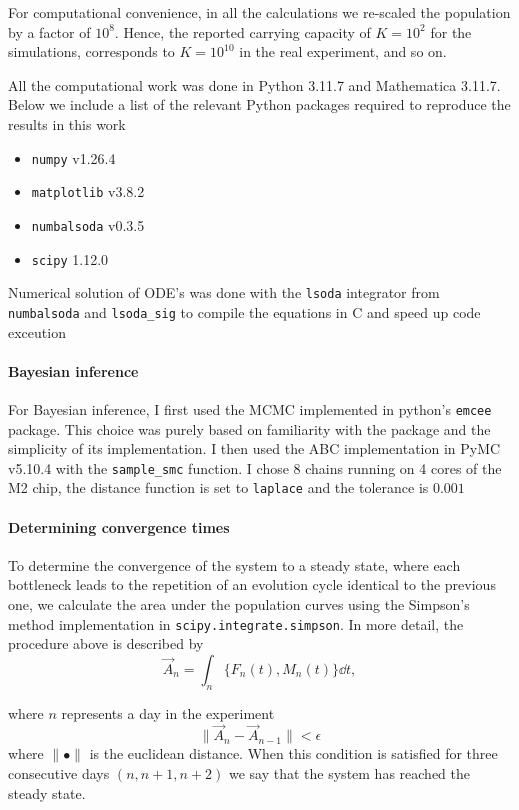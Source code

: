 \documentclass[10pt,a4paper]{scrartcl}
\begin{document}
For computational convenience, in all the calculations we re-scaled the population by a factor of $10^8$. Hence, the reported carrying capacity of $K = 10^2$ for the simulations, corresponds to $K = 10^{10}$ in the real experiment, and so on.

All the computational work was done in Python 3.11.7 and Mathematica 3.11.7. 
Below we include a list of the relevant Python packages required to reproduce the results in this work
\begin{itemize}
\item \verb|numpy| v1.26.4
\item \verb|matplotlib| v3.8.2
\item \verb|numbalsoda| v0.3.5
\item \verb|scipy| 1.12.0
\end{itemize}

Numerical solution of ODE's was done with the \verb|lsoda| integrator from \verb|numbalsoda| and \verb|lsoda_sig| to compile the equations in C and speed up code exceution


\paragraph{Bayesian inference}
For Bayesian inference, I first used the MCMC implemented in python's \verb|emcee| package. This choice was purely based on familiarity with the package and the simplicity of its implementation. I then used the ABC implementation in PyMC v5.10.4 with the \verb|sample_smc| function. I chose 8 chains running on 4 cores of the M2 chip, the distance function is set to \verb|laplace| and the tolerance is $0.001$


\paragraph{Determining convergence times}
To determine the convergence of the system to a steady state, where each bottleneck leads to the repetition of an evolution cycle identical to the previous one, we calculate the area under the population curves using the Simpson's method implementation in \verb|scipy.integrate.simpson|. In more detail, the procedure above is described by
\begin{equation}
	\vec{A}_n = \int_n \{F_n(t),M_n(t)\} \dd t,
\end{equation}

where $n$ represents a day in the experiment
\begin{equation}
	\|\vec{A}_n - \vec{A}_{n-1} \| < \epsilon
\end{equation}
where $\|\bullet\|$ is the euclidean distance. When this condition is satisfied for three consecutive days $(n, n+1, n+2)$ we say that the system has reached the steady state.
\end{document}
